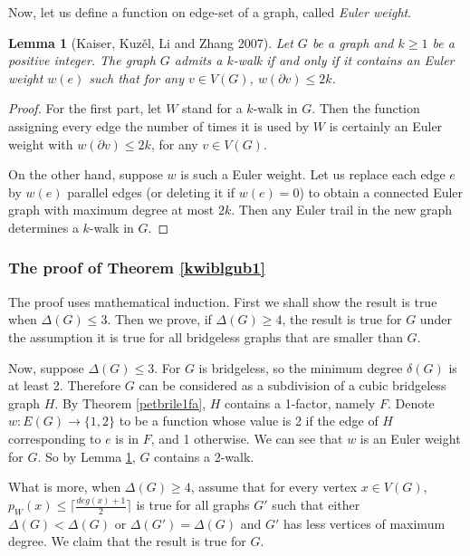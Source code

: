 \documentclass[12pt]{report}
\newtheorem{lemma}{Lemma}
\begin{document}
Now, let us define a function on edge-set of a graph, called {\em Euler weight}.





\begin{lemma}[Kaiser, Kuz{\v{e}}l, Li and Zhang 2007]\label{lm4inbri}
Let $G$ be a graph and $k\ge1$ be a positive integer. The graph $G$ admits a $k$-walk if and only if it contains an Euler weight $w(e)$ such that for any $v\in V(G)$, $w(\partial v)\le 2k$.
\end{lemma}

\begin{proof}
For the first part, let $W$ stand for a $k$-walk in $G$. Then the function assigning every edge the number of times it is used by $W$ is certainly an Euler weight with $w(\partial v)\le 2k$, for any $v\in V(G)$.

On the other hand, suppose $w$ is such a Euler weight. Let us replace each edge $e$ by $w(e)$ parallel edges (or deleting it if $w(e)=0$) to obtain a connected Euler graph with maximum degree at most $2k$. Then any Euler trail in the new graph determines a $k$-walk in $G$.
\end{proof}



\subsubsection{The proof of Theorem \ref{kwiblgub1}}
The proof uses mathematical induction. First we shall show the result is true when $\Delta(G)\le3$. Then we prove, if $\Delta(G)\ge4$, the result is true for $G$ under the assumption it is true for all bridgeless graphs that are smaller than $G$.

Now, suppose $\Delta(G)\le3$. For $G$ is bridgeless, so the minimum degree $\delta(G)$ is at least 2. Therefore $G$ can be considered as a subdivision of a cubic bridgeless graph $H$. By Theorem \ref{petbrile1fa}, $H$ contains a 1-factor, namely $F$. Denote $w:E(G)\rightarrow\{1,2\}$ to be a function whose value is 2 if the edge of $H$ corresponding to $e$ is in $F$, and 1 otherwise. We can see that $w$ is an Euler weight for $G$. So by Lemma \ref{lm4inbri}, $G$ contains a 2-walk.

What is more, when $\Delta(G)\ge4$, assume that for every vertex $x\in V(G)$, $p_W(x)\le\lceil\frac{deg(x)+1}{2}\rceil$ is true for all graphs $G'$ such that either $\Delta(G)<\Delta(G)$ or $\Delta(G')=\Delta(G)$ and $G'$ has less vertices of maximum degree. We claim that the result is true for $G$.
\end{document}

